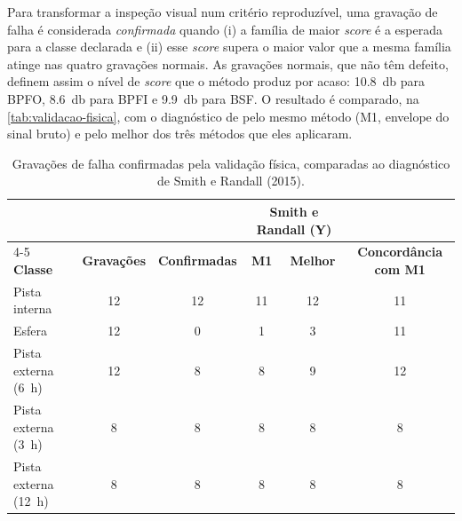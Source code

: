 Para transformar a inspeção visual num critério reproduzível, uma gravação de
falha é considerada \emph{confirmada} quando (i) a família de maior \emph{score} é a
esperada para a classe declarada e (ii) esse \emph{score} supera o maior valor que a
mesma família atinge nas quatro gravações normais. As gravações normais, que não
têm defeito, definem assim o nível de \emph{score} que o método produz por acaso:
\SI{10.8}{\decibel} para BPFO, \SI{8.6}{\decibel} para BPFI e
\SI{9.9}{\decibel} para BSF. O resultado é comparado, na
\autoref{tab:validacao-fisica}, com o diagnóstico de \textcite[Tab.~B2,
p.~128]{smith2015} pelo mesmo método (M1, envelope do sinal bruto) e pelo melhor
dos três métodos que eles aplicaram.

\begin{table}[htb]
  \centering
  \caption{Gravações de falha confirmadas pela validação física, comparadas ao
  diagnóstico de Smith e Randall (2015).}
  \label{tab:validacao-fisica}
  \begin{tabular}{lccccc}
    \toprule
    & & & \multicolumn{2}{c}{\textbf{Smith e Randall (Y)}} & \\
    \cmidrule(lr){4-5}
    \textbf{Classe} & \textbf{Gravações} & \textbf{Confirmadas} &
    \textbf{M1} & \textbf{Melhor} & \textbf{Concordância com M1} \\
    \midrule
    Pista interna        & 12 & 12 & 11 & 12 & 11 \\
    Esfera               & 12 & 0  & 1  & 3  & 11 \\
    Pista externa (6~h)  & 12 & 8  & 8  & 9  & 12 \\
    Pista externa (3~h)  & 8  & 8  & 8  & 8  & 8 \\
    Pista externa (12~h) & 8  & 8  & 8  & 8  & 8 \\
    \bottomrule
  \end{tabular}
\end{table}

